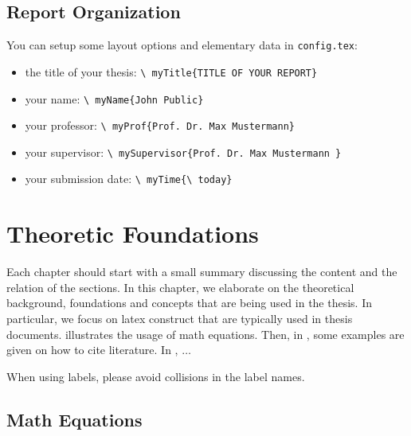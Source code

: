 \documentclass[a4paper,11pt,\myPageLayout]{book}
\begin{document}
\section{Report Organization}
\label{section:thesisOrganization}
You can setup some layout options and elementary data in \texttt{config.tex}:
\begin{itemize}
    \item the title of your thesis: \texttt{\textbackslash{} myTitle\{TITLE OF YOUR REPORT\}}
    \item your name: \texttt{\textbackslash{} myName\{John Public\}}
    \item your professor: \texttt{\textbackslash{} myProf\{Prof.\ Dr.\ Max Mustermann\}}
    \item your supervisor: \texttt{\textbackslash{} mySupervisor\{Prof.\ Dr.\ Max Mustermann \}}    
    \item your submission date: \texttt{\textbackslash{} myTime\{\textbackslash{} today\}}        
\end{itemize}

\chapter{Theoretic Foundations}
\label{chapter:Foundations}

Each chapter should start with a small summary discussing the content and the relation
of the sections. In this chapter, we elaborate on the theoretical background, 
foundations and concepts that are being used in the thesis. In particular, we 
focus on latex construct that are typically used in thesis documents.
 illustrates the usage of math equations.
Then, in , some examples are given on how to cite literature.
In , $\ldots$

When using labels, please avoid collisions in the label names.


\section{Math Equations}
\label{section:mathEquations}
\end{document}

